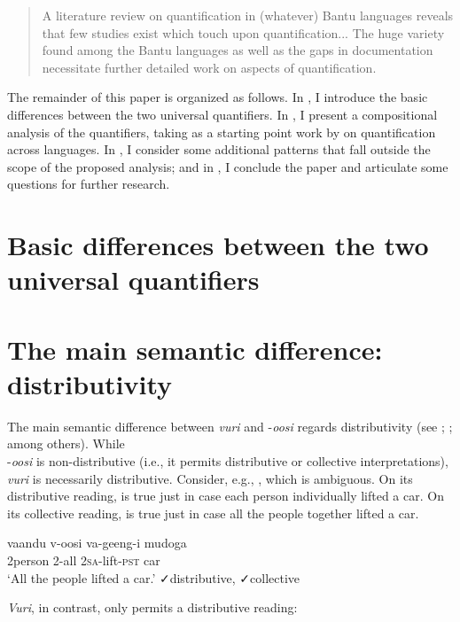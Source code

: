 \documentclass[output=paper]{langsci/langscibook}
\begin{document}
\begin{quote}
A literature review on quantification in (whatever) Bantu languages reveals that few studies exist which touch upon quantification... The huge variety found among the Bantu languages as well as the gaps in documentation necessitate further detailed work on aspects of quantification. \citep[383, 412]{ZerbianKrifka2008}
\end{quote}

The remainder of this paper is organized as follows. In , I introduce the basic differences between the two universal quantifiers. In , I present a compositional analysis of the quantifiers, taking as a starting point work by \citet{Matthewson2013} on quantification across languages. In , I consider some additional patterns that fall outside the scope of the proposed analysis; and in , I conclude the paper and articulate some questions for further research.

\section{Basic differences between the two universal quantifiers}

\section{The main semantic difference: distributivity} 

The main semantic difference between \textit{vuri} and -\textit{oosi} regards distributivity (see \citealt{Gil1995}; \citealt{Vendler1962}; among others). While \\
-\textit{oosi} is non-distributive (i.e., it permits distributive or collective interpretations), \textit{vuri} is necessarily distributive. Consider, e.g., , which is ambiguous. On its distributive reading,  is true just in case each person individually lifted a car. On its collective reading,  is true just in case all the people together lifted a car.

\ea
\gll vaandu  v-oosi    va-geeng-i    mudoga\\
     2person  2-all    2\textsc{sa}-lift-\textsc{pst}    car\\
\glt ‘All the people lifted a car.’  ✓distributive, ✓collective
\z

\textit{Vuri}, in contrast, only permits a distributive reading:
\end{document}
